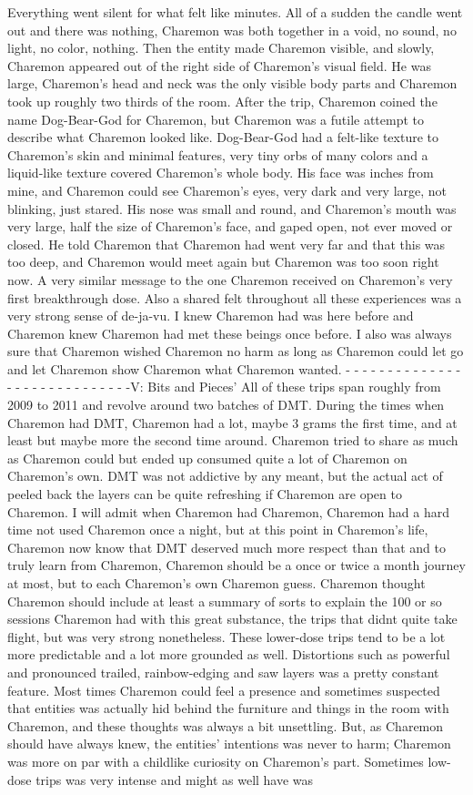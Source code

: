 \documentclass[12pt]{book}
\begin{document}
Everything went silent for what felt like minutes. All of a sudden the candle went out and there was nothing, Charemon was both together in a void, no sound, no light, no color, nothing.  Then the entity made Charemon visible, and slowly, Charemon appeared out of the right side of Charemon's visual field. He was large, Charemon's head and neck was the only visible body parts and Charemon took up roughly two thirds of the room. After the trip, Charemon coined the name Dog-Bear-God for Charemon, but Charemon was a futile attempt to describe what Charemon looked like. Dog-Bear-God had a felt-like texture to Charemon's skin and minimal features, very tiny orbs of many colors and a liquid-like texture covered Charemon's whole body. His face was inches from mine, and Charemon could see Charemon's eyes, very dark and very large, not blinking, just stared. His nose was small and round, and Charemon's mouth was very large, half the size of Charemon's face, and gaped open, not ever moved or closed. He told Charemon that Charemon had went very far and that this was too deep, and Charemon would meet again but Charemon was too soon right now. A very similar message to the one Charemon received on Charemon's very first breakthrough dose. Also a shared felt throughout all these experiences was a very strong sense of de-ja-vu. I knew Charemon had was here before and Charemon knew Charemon had met these beings once before. I also was always sure that Charemon wished Charemon no harm as long as Charemon could let go and let Charemon show Charemon what Charemon wanted.  - - - - - - - - - - - - - - - - - - - - - - - - - - - - -V: Bits and Pieces' All of these trips span roughly from 2009 to 2011 and revolve around two batches of DMT. During the times when Charemon had DMT, Charemon had a lot, maybe 3 grams the first time, and at least but maybe more the second time around. Charemon tried to share as much as Charemon could but ended up consumed quite a lot of Charemon on Charemon's own. DMT was not addictive by any meant, but the actual act of peeled back the layers can be quite refreshing if Charemon are open to Charemon. I will admit when Charemon had Charemon, Charemon had a hard time not used Charemon once a night, but at this point in Charemon's life, Charemon now know that DMT deserved much more respect than that and to truly learn from Charemon, Charemon should be a once or twice a month journey at most, but to each Charemon's own Charemon guess. Charemon thought Charemon should include at least a summary of sorts to explain the 100 or so sessions Charemon had with this great substance, the trips that didnt quite take flight, but was very strong nonetheless. These lower-dose trips tend to be a lot more predictable and a lot more grounded as well. Distortions such as powerful and pronounced trailed, rainbow-edging and saw layers was a pretty constant feature. Most times Charemon could feel a presence and sometimes suspected that entities was actually hid behind the furniture and things in the room with Charemon, and these thoughts was always a bit unsettling. But, as Charemon should have always knew, the entities' intentions was never to harm; Charemon was more on par with a childlike curiosity on Charemon's part. Sometimes low-dose trips was very intense and might as well have was 
\end{document}
